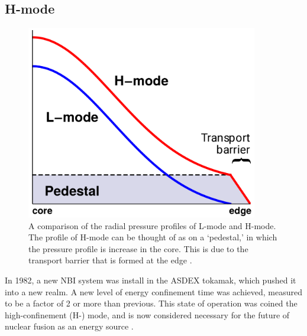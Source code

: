 \documentclass[a4paper]{article}
\begin{document}
\subsection{H-mode}
\begin{figure}[b]
\begin{minipage}{0.48\linewidth}
	\centering
	\includegraphics[width=0.9\textwidth]{../../Graphics/L-mode_H-mode_compare.png}
\end{minipage}
\hfill
\begin{minipage}{0.48\linewidth}
	\caption{A comparison of the radial pressure profiles of L-mode and H-mode.
	The profile of H-mode can be thought of as on a `pedestal,' in which the pressure profile is increase in the core.
	This is due to the transport barrier that is formed at the edge \cite{weymiens_bifurcation_2014}.}
	\label{fig:L-mode_H-mode_compare}
\end{minipage}
\end{figure}

In 1982, a new NBI system was install in the ASDEX tokamak, which pushed it into a new realm.
A new level of energy confinement time was achieved, measured to be a factor of 2 or more than previous.
This state of operation was coined the high-confinement (H-) mode, and is now considered necessary for the future of nuclear fusion as an energy source \cite{arnoux_how_2009} \cite{wagner_development_1984}.
\end{document}
